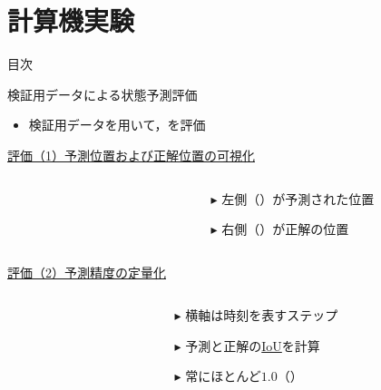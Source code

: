 \section{計算機実験}

\begin{frame}[noframenumbering]{目次}
    \tableofcontents[currentsection]
\end{frame}

\begin{frame}{検証用データによる状態予測評価}
    \begin{itemize}
        \item 検証用データを用いて，を評価
    \end{itemize}
    \vspace{0.5zh}
    \uline{評価（1）予測位置および正解位置の可視化}
    \begin{columns}
        \begin{column}{.6\linewidth}
            \begin{figure}
            \end{figure}              
        \end{column}
        \begin{column}{.4\linewidth}
            \begin{itemize}
                \item[$\blacktriangleright$] 左側（）が予測された位置
                \item[$\blacktriangleright$] 右側（）が正解の位置
            \end{itemize}
        \end{column}
    \end{columns}
    \uline{評価（2）予測精度の定量化}
    \begin{columns}
        \begin{column}{.6\linewidth}
        \end{column}
        \begin{column}{.4\linewidth}
            \vspace{-2.5zh}
            \begin{itemize}
                \item[$\blacktriangleright$] 横軸は時刻を表すステップ
                \item[$\blacktriangleright$] 予測と正解の\uline{IoU}を計算
                \item[$\blacktriangleright$] 常にほとんど$1.0$（）
            \end{itemize}
        \end{column}
    \end{columns}
\end{frame}

